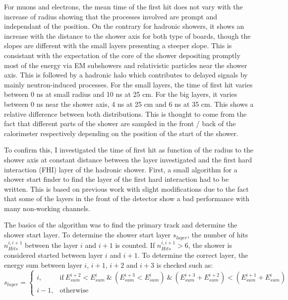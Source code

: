 For muons and electrons, the mean time of the first hit does not vary with the increase of radius showing that the processes involved are prompt and independant of the position. On the contrary for hadronic showers, it shows an increase with the distance to the shower axis for both type of boards, though the slopes are different with the small layers presenting a steeper slope. This is consistant with the expectation of the core of the shower depositing promptly most of the energy via EM subshowers and relativistic particles near the shower axis. This is followed by a hadronic halo which contributes to delayed signals by mainly neutron-induced processes. For the small layers, the time of first hit varies between 0 ns at small radius and 10 ns at 25 cm. For the big layers, it varies between 0 ns near the shower axis, 4 ns at 25 cm and 6 ns at 35 cm. This shows a relative difference between both distributions. This is thought to come from the fact that different parts of the shower are sampled in the front / back of the calorimeter respectively depending on the position of the start of the shower.

To confirm this, I investigated the time of first hit as function of the radius to the shower axis at constant distance between the layer investigated and the first hard interaction (FHI) layer of the hadronic shower. First, a small algorithm for a shower start finder to find the layer of the first hard interaction had to be written. This is based on previous work \cite{CaN026} with slight modifications due to the fact that some of the layers in the front of the detector show a bad performance with many non-working channels.

The basics of the algorithm was to find the primary track and determine the shower start layer. To determine the shower start layer $s_{layer}$, the number of hits $n_{Hits}^{i, i+1}$ between the layer $i$ and $i+1$ is counted. If $n_{Hits}^{i, i+1} > 6$, the shower is considered started between layer $i$ and $i+1$. To determine the correct layer, the energy sum between layer $i$, $i+1$, $i+2$ and $i+3$ is checked such as:
\begin{equation*}
	s_{layer} =
	\begin{cases}
		i, & \text{if} \: E_{sum}^{i+2} < E_{sum}^{i} \:\&\: (E_{sum}^{i+3} < E_{sum}^{i}) \:\&\: (E_{sum}^{i+3} + E_{sum}^{i+2}) < (E_{sum}^{i+1} + E_{sum}^{i}) \\
		i-1, & \text{otherwise}
	\end{cases}
\end{equation*}

